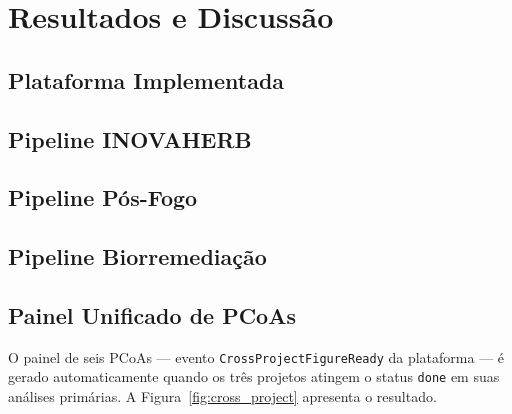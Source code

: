 \chapter{Resultados e Discussão}
\label{cap:resultados}


\section{Plataforma Implementada}


\section{Pipeline INOVAHERB}


\section{Pipeline Pós-Fogo}


\section{Pipeline Biorremediação}


\section{Painel Unificado de PCoAs}

O painel de seis PCoAs — evento \texttt{CrossProjectFigureReady} da
plataforma — é gerado automaticamente quando os três projetos atingem
o status \texttt{done} em suas análises primárias. A
Figura~\ref{fig:cross_project} apresenta o resultado.


